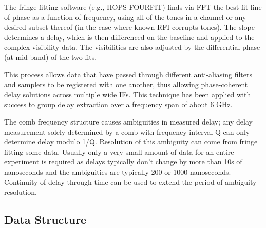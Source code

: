 \documentclass[11pt,a4paper]{article}
\begin{document}
The fringe-fitting software (e.g., HOPS FOURFIT) finds via FFT the
best-fit line of phase as a function of frequency, using all of the
tones in a channel or any desired subset thereof (in the case where
known RFI corrupts tones). The slope determines a delay, which is then
differenced on the baseline and applied to the complex visibility
data.  The visibilities are also adjusted by the differential phase
(at mid-band) of the two fits.

This process allows data that have passed through different
anti-aliasing filters and samplers to be registered with one another,
thus allowing phase-coherent delay solutions across multiple wide IFs.
This technique has been applied with success to group delay extraction
over a frequency span of about 6 GHz.

The comb frequency structure causes ambiguities in measured delay; any
delay measurement solely determined by a comb with frequency interval
Q can only determine delay modulo 1/Q. Resolution of this ambiguity
can come from fringe fitting some data. Usually only a very small
amount of data for an entire experiment is required as delays
typically don’t change by more than 10s of nanoseconds and the
ambiguities are typically 200 or 1000 nanoseconds. Continuity of delay
through time can be used to extend the period of ambiguity resolution.

\subsection{Data Structure}
\end{document}
